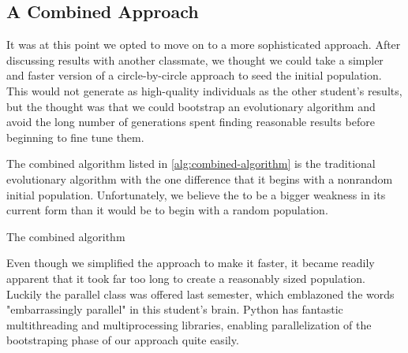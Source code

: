 \documentclass{article}
\begin{document}
\subsection{A Combined Approach}\label{sec:strat:combined-approach}

It was at this point we opted to move on to a more sophisticated approach. After discussing results with another classmate, we thought we could take a simpler and faster version of a circle-by-circle approach to seed the initial population. This would not generate as high-quality individuals as the other student's results, but the thought was that we could bootstrap an evolutionary algorithm and avoid the long number of generations spent finding reasonable results before beginning to fine tune them.

The combined algorithm listed in \autoref{alg:combined-algorithm} is the traditional evolutionary algorithm with the one difference that it begins with a nonrandom initial population. Unfortunately, we believe the to be a bigger weakness in its current form than it would be to begin with a random population.
\begin{algorithm}[h]
    \begin{algorithmic}
                \Statex
            \EndFor
            \State{}
        \EndFunction{}
    \end{algorithmic}
    \caption{The combined algorithm}\label{alg:combined-algorithm}
\end{algorithm}

Even though we simplified the approach to make it faster, it became readily apparent that it took far too long to create a reasonably sized population. Luckily the parallel class was offered last semester, which emblazoned the words "embarrassingly parallel" in this student's brain. Python has fantastic multithreading and multiprocessing libraries, enabling parallelization of the bootstraping phase of our approach quite easily.
\end{document}
